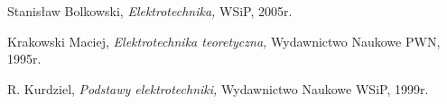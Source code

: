 \documentclass[polish,polish,a4paper]{article}
\begin{document}
	\begin{thebibliography}{99}


		 Stanisław Bolkowski,  \emph{Elektrotechnika,} WSiP, 2005r.
		
		 Krakowski Maciej,  \emph{Elektrotechnika teoretyczna,} Wydawnictwo Naukowe PWN, 1995r.
		
		 R. Kurdziel,  \emph{Podstawy elektrotechniki,} Wydawnictwo Naukowe WSiP, 1999r.

	\end{thebibliography}
		
	\newpage
	\tableofcontents
		
\end{document}
